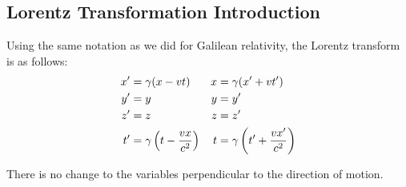 \documentclass[class=article, crop=false]{standalone}
\begin{document}
  \subsection{Lorentz Transformation Introduction}
  Using the same notation as we did for Galilean relativity, the Lorentz transform is as follows:
  \begin{align*}
    x' &= \gamma(x - vt) & x &= \gamma(x' + vt') \\
    y' &= y & y &= y' \\
    z' &= z & z &= z' \\
    t' &= \gamma\left( t - \frac{vx}{c^2} \right) & t &= \gamma\left( t' + \frac{vx'}{c^2} \right)
  \end{align*}
  \begin{note}{}
    There is no change to the variables perpendicular to the direction of motion.
  \end{note}
\end{document}
